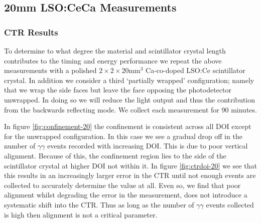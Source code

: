 \subsection{20mm LSO:CeCa Measurements}
\label{sec:20mm}
\subsubsection{CTR Results}
To determine to what degree the material and scintillator crystal length contributes to the timing and energy performance we repeat the above measurements with a polished $2\times2\times20$mm$^3$ Ca-co-doped LSO:Ce scintillator crystal. In addition we consider a third `partially wrapped' configuration; namely that we wrap the side faces but leave the face opposing the photodetector unwrapped. In doing so we will reduce the light output and thus the contribution from the backwards reflecting mode. We collect each measurement for 90 minutes.

In figure \ref{fig:confinement-20} the confinement is consistent across all DOI except for the unwrapped configuration. In this case we see a gradual drop off in the number of $\gamma\gamma$ events recorded with increasing DOI. This is due to poor vertical alignment. Because of this, the confinement region lies to the side of the scintillator crystal at higher DOI not within it. In figure \ref{fig:ctrdoi-20} we see that this results in an increasingly larger error in the CTR until not enough events are collected to accurately determine the value at all. Even so, we find that poor alignment whilst degrading the error in the measurement, does not introduce a systematic shift into the CTR. Thus as long as the number of $\gamma\gamma$ events collected is high then alignment is not a critical parameter. 
